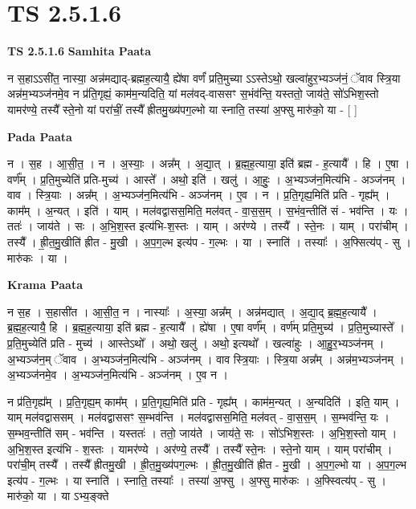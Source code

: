 \documentclass[17pt]{extarticle}
\begin{document}
\section*{ TS 2.5.1.6 }

\textbf{TS 2.5.1.6 } \newline
\textbf{Samhita Paata} \newline

न स॒हाऽऽसी॑त॒ नास्या॒ अन्न॑मद्याद्-ब्रह्मह॒त्यायै॒ ह्ये॑षा वर्णं॑ प्रति॒मुच्या ऽऽस्तेऽथो॒ खल्वा॑हुर॒भ्यञ्ज॑नं॒ ॅवाव स्त्रि॒या अन्न॑म॒भ्यञ्ज॑नमे॒व न प्र॑ति॒गृह्यं॒ काम॑म॒न्यदिति॒ यां मल॑वद्-वाससꣳ स॒भंव॑न्ति॒ यस्ततो॒ जाय॑ते॒ सो॑ऽभिश॒स्तो यामर॑ण्ये॒ तस्यै᳚ स्ते॒नो यां परा॑चीं॒ तस्यै᳚ ह्रीतमु॒ख्य॑पग॒ल्भो या स्नाति॒ तस्या॑ अ॒फ्सु मारु॑को॒ या - [  ] \newline

\textbf{Pada Paata} \newline

न । स॒ह । आ॒सी॒त॒ । न । अ॒स्याः॒ । अन्न᳚म् । अ॒द्या॒त् । ब्र॒ह्म॒ह॒त्याया॒ इति॑ ब्रह्म - ह॒त्यायै᳚ । हि । ए॒षा । वर्ण᳚म् । प्र॒ति॒मुच्येति॑ प्रति-मुच्य॑ । आस्ते᳚ । अथो॒ इति॑ । खलु॑ । आ॒हुः॒ । अ॒भ्यञ्ज॑न॒मित्य॑भि - अञ्ज॑नम् । वाव । स्त्रि॒याः । अन्न᳚म् । अ॒भ्यञ्ज॑न॒मित्य॑भि - अञ्ज॑नम् । ए॒व । न । प्र॒ति॒गृह्य॒मिति॑ प्रति - गृह्य᳚म् । काम᳚म् । अ॒न्यत् । इति॑ । याम् । मल॑वद्वासस॒मिति॒ मल॑वत् - वा॒स॒स॒म् । स॒भंव॒न्तीति॑ सं - भव॑न्ति । यः । ततः॑ । जाय॑ते । सः । अ॒भि॒श॒स्त इत्य॑भि-श॒स्तः । याम् । अर॑ण्ये । तस्यै᳚ । स्ते॒नः । याम् । परा॑चीम् । तस्यै᳚ । ह्री॒त॒मु॒खीति॑ ह्रीत - मु॒खी । अ॒प॒ग॒ल्भ इत्य॑प - ग॒ल्भः । या । स्नाति॑ । तस्याः᳚ । अ॒फ्सित्य॑प् - सु । मारु॑कः । या ।  \newline


\textbf{Krama Paata} \newline

न स॒ह । स॒हासी॑त । आ॒सी॒त॒ न । नास्याः᳚ । अ॒स्या॒ अन्न᳚म् । अन्न॑मद्यात् । अ॒द्या॒द् ब्र॒ह्म॒ह॒त्यायै᳚ । ब्र॒ह्म॒ह॒त्यायै॒ हि । ब्र॒ह्म॒ह॒त्याया॒ इति॑ ब्रह्म - ह॒त्यायै᳚ । ह्ये॑षा । ए॒षा वर्ण᳚म् । वर्ण॑म् प्रति॒मुच्य॑ । प्र॒ति॒मुच्यास्ते᳚ । प्र॒ति॒मुच्येति॑ प्रति - मुच्य॑ । आस्तेऽथो᳚ । अथो॒ खलु॑ । अथो॒ इत्यथो᳚ । खल्वा॑हुः । 
आ॒हु॒र॒भ्यञ्ज॑नम् । अ॒भ्यञ्ज॑न॒म् ॅवाव । अ॒भ्यञ्ज॑न॒मित्य॑भि - अञ्ज॑नम् । वाव स्त्रि॒याः । स्त्रि॒या अन्न᳚म् । अन्न॑म॒भ्यञ्ज॑नम् । अ॒भ्यञ्ज॑नमे॒व । अ॒भ्यञ्ज॑न॒मित्य॑भि - अञ्ज॑नम् । ए॒व न । 

न प्र॑ति॒गृह्य᳚म् । प्र॒ति॒गृह्य॒म् काम᳚म् । प्र॒ति॒गृह्य॒मिति॑ प्रति - गृह्य᳚म् । काम॑म॒न्यत् । अ॒न्यदिति॑ । इति॒ याम् । याम् मल॑वद्वाससम् । मल॑वद्वाससꣳ स॒म्भव॑न्ति । मल॑वद्वासस॒मिति॒ मल॑वत् - वा॒स॒स॒म् । स॒म्भव॑न्ति॒ यः । स॒म्भव॒न्तीति॑ सम् - भव॑न्ति । यस्ततः॑ । ततो॒ जाय॑ते । जाय॑ते॒ सः । सो॑ऽभिश॒स्तः । अ॒भि॒श॒स्तो याम् । अ॒भि॒श॒स्त इत्य॑भि - श॒स्तः । यामर॑ण्ये । अर॑ण्ये॒ तस्यै᳚ । तस्यै᳚ स्ते॒नः । स्ते॒नो याम् । याम् परा॑चीम् । परा॑ची॒म् तस्यै᳚ । तस्यै᳚ ह्रीतमु॒खी । ह्री॒त॒मु॒ख्य॑पग॒ल्भः । ह्री॒त॒मु॒खीति॑ ह्रीत - मु॒खी । अ॒प॒ग॒ल्भो या । अ॒प॒ग॒ल्भ इत्य॑प - ग॒ल्भः । या स्नाति॑ । स्नाति॒ तस्याः᳚ । तस्या॑ अ॒फ्सु । अ॒फ्सु मारु॑कः । अ॒फ्स्वित्य॑प् - सु । मारु॑को॒ या । या ऽभ्य॒ङ्क्ते \newline
\end{document}
